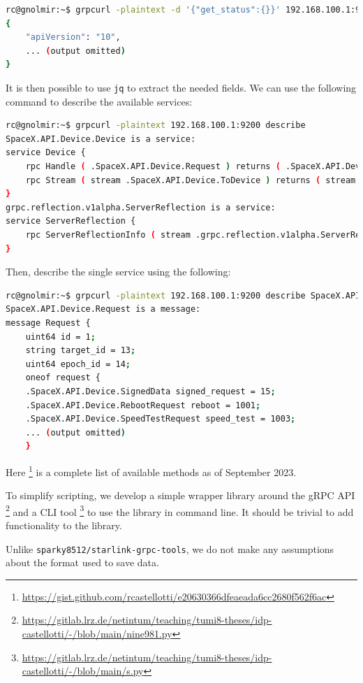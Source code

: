 \documentclass[IN,11pt,twoside,openright,idp,english]{tumthesis}
\begin{document}
\begin{lstlisting}[language=bash]
rc@gnolmir:~$ grpcurl -plaintext -d '{"get_status":{}}' 192.168.100.1:9200 SpaceX.API.Device.Device/Handle
{
    "apiVersion": "10",
    ... (output omitted)
}
\end{lstlisting}

It is then possible to use \texttt{jq} to extract the needed fields. We can use the following command to describe the available services:
    
\begin{lstlisting}[language=bash]
rc@gnolmir:~$ grpcurl -plaintext 192.168.100.1:9200 describe
SpaceX.API.Device.Device is a service:
service Device {
    rpc Handle ( .SpaceX.API.Device.Request ) returns ( .SpaceX.API.Device.Response );
    rpc Stream ( stream .SpaceX.API.Device.ToDevice ) returns ( stream .SpaceX.API.Device.FromDevice );
}
grpc.reflection.v1alpha.ServerReflection is a service:
service ServerReflection {
    rpc ServerReflectionInfo ( stream .grpc.reflection.v1alpha.ServerReflectionRequest ) returns ( stream .grpc.reflection.v1alpha.ServerReflectionResponse );
}
\end{lstlisting}
    
Then, describe the single service using the following:
    
\begin{lstlisting}[language=bash]
rc@gnolmir:~$ grpcurl -plaintext 192.168.100.1:9200 describe SpaceX.API.Device.Request
SpaceX.API.Device.Request is a message:
message Request {
    uint64 id = 1;
    string target_id = 13;
    uint64 epoch_id = 14;
    oneof request {
    .SpaceX.API.Device.SignedData signed_request = 15;
    .SpaceX.API.Device.RebootRequest reboot = 1001;
    .SpaceX.API.Device.SpeedTestRequest speed_test = 1003;
    ... (output omitted)
    }
\end{lstlisting}
    
Here \footnote{\url{https://gist.github.com/rcastellotti/e20630366dfeaeada6cc2680f562f6ac}} is a complete list of available methods as of September 2023.

To simplify scripting, we develop a simple wrapper library around the gRPC API  \footnote{\url{https://gitlab.lrz.de/netintum/teaching/tumi8-theses/idp-castellotti/-/blob/main/nine981.py}} and a CLI tool \footnote{\url{https://gitlab.lrz.de/netintum/teaching/tumi8-theses/idp-castellotti/-/blob/main/s.py}} to use the library in command line. It should be trivial to add functionality to the library.

Unlike \texttt{sparky8512/starlink-grpc-tools}, we do not make any assumptions about the format used to save data.
\end{document}
